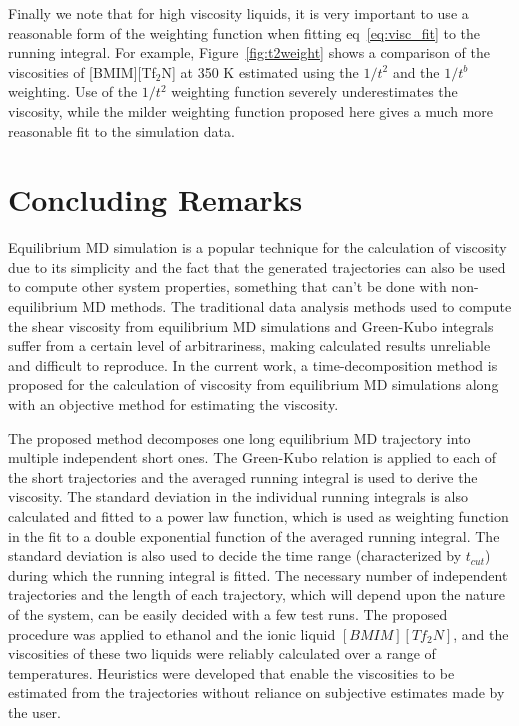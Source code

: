 \documentclass[12pt]{article}
\begin{document}
Finally we note that for high viscosity liquids, it is very important to use a reasonable form of the weighting function when fitting eq~\ref{eq:visc_fit} to the running integral. For example, Figure~\ref{fig:t2weight} shows a comparison of the viscosities of [BMIM][Tf$_2$N] at 350 K estimated using the  $1/t^2$  and the $1/t^b$ weighting. Use of the $1/t^2$ weighting function severely underestimates the viscosity, while the milder weighting function proposed here gives a much more reasonable fit to the simulation data. 

\section{Concluding Remarks}

Equilibrium MD simulation is a popular technique 
for the calculation of viscosity due to its simplicity
and the fact that the generated trajectories can also be used to compute other system properties,
something that can't be done with non-equilibrium MD methods.
The traditional data analysis methods used to compute the shear viscosity from equilibrium MD simulations and Green-Kubo integrals 
suffer from a certain level of arbitrariness,
making calculated results unreliable and difficult to reproduce. In the current work,
a time-decomposition method is proposed for the calculation of viscosity from equilibrium MD simulations along with an objective method for estimating the viscosity.

The proposed method decomposes one long equilibrium MD trajectory into multiple independent short ones.
The Green-Kubo relation is applied to each of the short trajectories
and the averaged running integral is used to derive the viscosity.
The standard deviation in the individual running integrals is also calculated and fitted to a power law function,
which is used as weighting function in the fit to a double exponential function of the averaged running integral.
The standard deviation is also used to decide the time range (characterized by $t_{cut}$) 
during which the running integral is fitted.
The necessary number of independent trajectories and the length of each trajectory, which will depend upon the nature of the system, can be easily decided with a few test runs.
The proposed procedure was applied to ethanol and the ionic liquid $[BMIM][Tf_2N]$,
and the viscosities of these two liquids were reliably calculated over a range of temperatures. Heuristics were developed that enable the viscosities to be estimated from the trajectories without reliance on subjective estimates made by the user. 
\end{document}
